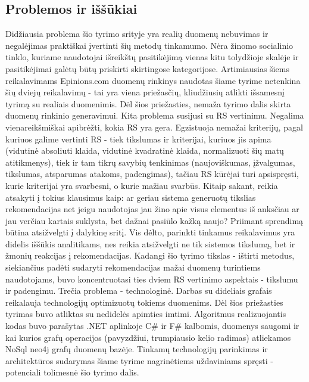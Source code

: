 \documentclass{VUMIFInfMagistrinis}
\begin{document}
\subsection{Problemos ir iššūkiai}
\indent
Didžiausia problema šio tyrimo srityje yra realių duomenų nebuvimas ir negalėjimas praktiškai įvertinti šių metodų tinkamumo. Nėra žinomo socialinio tinklo, kuriame naudotojai išreikštų pasitikėjimą vienas kitu tolydžioje skalėje ir pasitikėjimai galėtų būtų priskirti skirtingose kategorijose. Artimiausias šiems reikalavimams Epinions.com duomenų rinkinys naudotas šiame tyrime netenkina šių dviejų reikalavimų - tai yra viena priežasčių, kliudžiusių atlikti išsamesnį tyrimą su realiais duomenimis. Dėl šios priežasties, nemaža tyrimo dalis skirta duomenų rinkinio generavimui.
\newline
\indent
Kita problema susijusi su RS vertinimu. Negalima vienareikšmiškai apibrėžti, kokia RS yra gera. Egzistuoja nemažai kriterijų, pagal kuriuos galime vertinti RS - tiek tikslumas ir kriterijai, kuriuos jis apima (vidutinė absoliuti klaida, vidutinė kvadratinė klaida, normalizuoti šių matų atitikmenys), tiek ir tam tikrų savybių tenkinimas (naujoviškumas, įžvalgumas, tikslumas, atsparumas atakoms, padengimas), tačiau RS kūrėjai turi apsispręsti, kurie kriterijai yra svarbesni, o kurie mažiau svarbūs. Kitaip sakant, reikia atsakyti į tokius klausimus kaip: ar geriau sistema generuotų tikslias rekomendacijas net jeigu naudotojas jau žino apie visus elementus iš anksčiau ar jau verčiau kartais suklysta, bet dažnai pasiūlo kažką naujo? Priimant sprendimą būtina atsižvelgti į dalykinę sritį. Vis dėlto, parinkti tinkamus reikalavimus yra didelis iššūkis analitikams, nes reikia atsižvelgti ne tik sistemos tikslumą, bet ir žmonių reakcijas į rekomendacijas. Kadangi šio tyrimo tikslas - ištirti metodus, siekiančius padėti sudaryti rekomendacijas mažai duomenų turintiems naudotojams, buvo koncentruotasi ties dviem RS vertinimo aspektais - tikslumu ir padengimu.
\newline
\indent
Trečia problema - technologinė. Darbas su dideliais grafais reikalauja technologijų optimizuotų tokiems duomenims. Dėl šios priežasties tyrimas buvo atliktas su nedidelės apimties imtimi. Algoritmus realizuojantis kodas buvo parašytas .NET aplinkoje C\# ir F\# kalbomis, duomenys saugomi ir kai kurios grafų operacijos (pavyzdžiui, trumpiausio kelio radimas) atliekamos NoSql neo4j grafų duomenų bazėje. Tinkamų technologijų parinkimas ir architektūros sudarymas šiame tyrime nagrinėtiems uždaviniams spręsti - potenciali tolimesnė šio tyrimo dalis.
\end{document}
